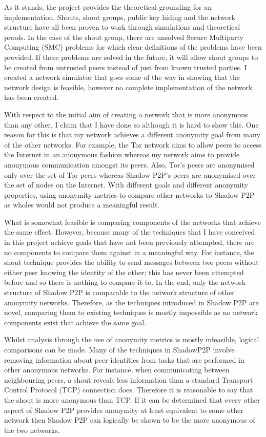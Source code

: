 \documentclass[ %
                    author={Luke Murray},
                supervisor={Dr. Simon Hollis},
                     title={Shadow Peer-to-Peer Networks},
                  subtitle={},
                    degree={MEng},
                      year={2013} ]{thesis}
\begin{document}
As it stands, the project provides the theoretical grounding for an implementation. Shouts, shout groups, public key hiding and the network structure have all been proven to work through simulations and theoretical proofs. In the case of the shout group, there are unsolved Secure Multiparty Computing (SMC) problems for which clear definitions of the problems have been provided. If these problems are solved in the future, it will allow shout groups to be created from untrusted peers instead of just from known trusted parties. I created a network simulator that goes some of the way in showing that the network design is feasible, however no complete implementation of the network has been created.

With respect to the initial aim of creating a network that is more anonymous than any other, I claim that I have done so although it is hard to show this. One reason for this is that my network achieves a different anonymity goal from many of the other networks. For example, the Tor network\cite{Tor} aims to allow peers to access the Internet in an anonymous fashion whereas my network aims to provide anonymous communication amongst its peers. Also, Tor's peers are anonymised only over the set of Tor peers whereas Shadow P2P's peers are anonymised over the set of nodes on the Internet. With different goals and different anonymity properties, using anonymity metrics to compare other networks to Shadow P2P as wholes would not produce a meaningful result.

What is somewhat feasible is comparing components of the networks that achieve the same effect. However, because many of the techniques that I have conceived in this project achieve goals that have not been previously attempted, there are no components to compare them against in a meaningful way. For instance, the shout technique provides the ability to send messages between two peers without either peer knowing the identity of the other; this has never been attempted before and so there is nothing to compare it to. In the end, only the network structure of Shadow P2P is comparable to the network structure of other anonymity networks. Therefore, as the techniques introduced in Shadow P2P are novel, comparing them to existing techniques is mostly impossible as no network components exist that achieve the same goal.

Whilst analysis through the use of anonymity metrics is mostly infeasible, logical comparisons can be made. Many of the techniques in ShadowP2P involve removing information about peer identities from tasks that are performed in other anonymous networks. For instance, when communicating between neighbouring peers, a shout reveals less information than a standard Transport Control Protocol (TCP) connection does. Therefore it is reasonable to say that the shout is more anonymous than TCP. If it can be determined that every other aspect of Shadow P2P provides anonymity at least equivalent to some other network then Shadow P2P can logically be shown to be the more anonymous of the two networks.
\end{document}
